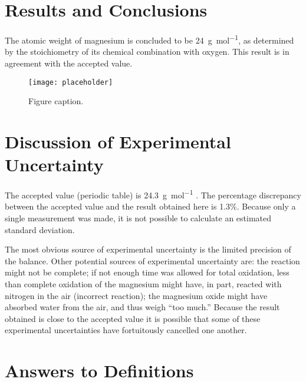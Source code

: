 \documentclass{article}
\begin{document}
\section{Results and Conclusions}

The atomic weight of magnesium is concluded to be \SI{24}{\gram\per\mol}, as
determined by the stoichiometry of its chemical combination with oxygen. This
result is in agreement with the accepted value.

\begin{figure}[h]
\begin{center}
\texttt{[image: placeholder]} %
\caption{Figure caption.}
\end{center}
\end{figure}


\section{Discussion of Experimental Uncertainty}

The accepted value (periodic table) is \SI{24.3}{\gram\per\mole}
\cite{Smith2012}. The percentage discrepancy between the accepted value and
the result obtained here is 1.3\%. Because only a single measurement was made,
it is not possible to calculate an estimated standard deviation.

The most obvious source of experimental uncertainty is the limited precision of
the balance. Other potential sources of experimental uncertainty are: the
reaction might not be complete; if not enough time was allowed for total
oxidation, less than complete oxidation of the magnesium might have, in part,
reacted with nitrogen in the air (incorrect reaction); the magnesium oxide
might have absorbed water from the air, and thus weigh ``too much.'' Because the
result obtained is close to the accepted value it is possible that some of
these experimental uncertainties have fortuitously cancelled one another.


\section{Answers to Definitions}
\end{document}

